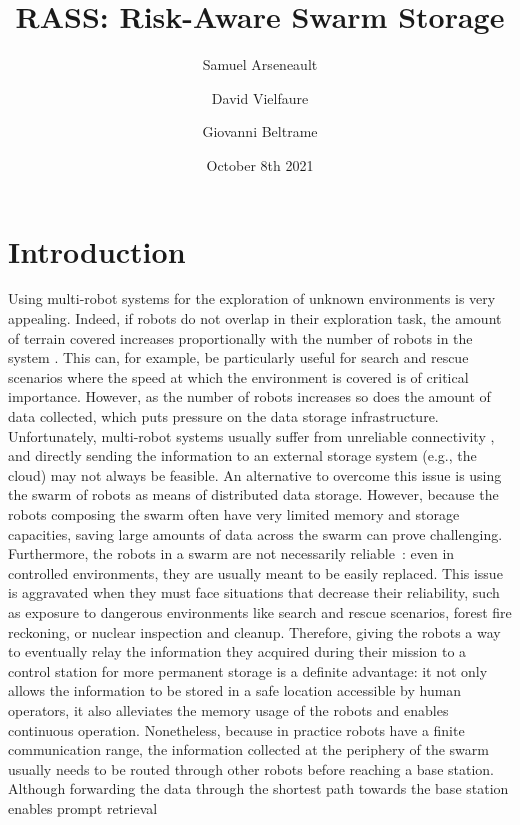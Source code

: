 \documentclass[sigconf]{aamas}
\title[RASS]{RASS: Risk-Aware Swarm Storage}
\author{Samuel Arseneault}
\affiliation{
  \institution{Polytechnique Montr\'eal}
  \city{Montr\'eal}
  \country{Canada}}
\author{David Vielfaure}
\affiliation{
  \institution{Polytechnique Montr\'eal}
  \city{Montr\'eal}
  \country{Canada}}
\author{Giovanni Beltrame}
\affiliation{
  \institution{Polytechnique Montr\'eal}
  \city{Montr\'eal}
  \country{Canada}}
\date{October 8th 2021}
\begin{document}
\pagestyle{fancy}
\fancyhead{}

\maketitle

\section{Introduction}
Using multi-robot systems for the exploration of unknown environments
is very appealing. Indeed, if robots do not overlap in their
exploration task, the amount of terrain covered increases
proportionally with the number of robots in the system
\cite{burgard2005coordinated}. This can, for example, be particularly
useful for search and rescue scenarios \cite{kantor2003search} where
the speed at which the environment is covered is of critical
importance. However, as the number of robots increases so does the
amount of data collected, which puts pressure on the data storage infrastructure. 
Unfortunately, multi-robot systems usually
suffer from unreliable connectivity \cite{amigoni2017multirobot}, and
directly sending the information to an external storage system
(e.g., the cloud) may not always be feasible. An alternative
to overcome this issue is using the swarm of
robots as means of distributed data storage. However, because the robots composing the swarm often have very limited memory and storage capacities, saving
large amounts of data across the swarm can prove
challenging. Furthermore, the robots in a swarm are not necessarily
reliable~\cite{winfield2006safety}: even in controlled environments, 
they are usually meant to be easily replaced. This issue
is aggravated when they must face situations that decrease their
reliability, such as exposure to dangerous environments like
search and rescue scenarios, forest fire reckoning, or nuclear
inspection and cleanup. Therefore, giving the robots a way to
eventually relay the information they acquired during their mission to
a control station for more permanent storage is a definite
advantage: it not only allows the information to be stored in a safe
location accessible by human operators, it also alleviates the memory
usage of the robots and enables continuous operation.  Nonetheless,
because in practice robots have a finite communication range, the
information collected at the periphery of the swarm usually needs to
be routed through other robots before reaching a base
station. Although forwarding the data through the shortest path
towards the base station enables prompt retrieval
\end{document}
